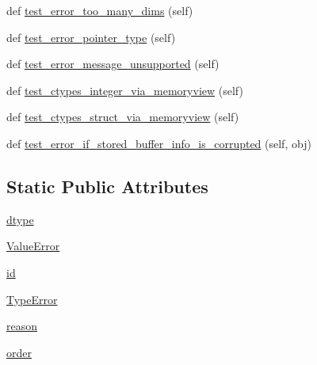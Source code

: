 \begin{DoxyCompactItemize}
def \hyperlink{classnumpy_1_1core_1_1tests_1_1test__multiarray_1_1TestNewBufferProtocol_a79ffe6eda22d8c97a056f10b239d3ecb}{test\+\_\+error\+\_\+too\+\_\+many\+\_\+dims} (self)
\item 
def \hyperlink{classnumpy_1_1core_1_1tests_1_1test__multiarray_1_1TestNewBufferProtocol_a1247bf00ff72ffba96c629f7abea78bd}{test\+\_\+error\+\_\+pointer\+\_\+type} (self)
\item 
def \hyperlink{classnumpy_1_1core_1_1tests_1_1test__multiarray_1_1TestNewBufferProtocol_a90f5aa2f57186c4939397c68f0f14856}{test\+\_\+error\+\_\+message\+\_\+unsupported} (self)
\item 
def \hyperlink{classnumpy_1_1core_1_1tests_1_1test__multiarray_1_1TestNewBufferProtocol_a9358562fc2cf78d22987d0c34dbc4f43}{test\+\_\+ctypes\+\_\+integer\+\_\+via\+\_\+memoryview} (self)
\item 
def \hyperlink{classnumpy_1_1core_1_1tests_1_1test__multiarray_1_1TestNewBufferProtocol_a361340c049b6dd7012ea361fe357414c}{test\+\_\+ctypes\+\_\+struct\+\_\+via\+\_\+memoryview} (self)
\item 
def \hyperlink{classnumpy_1_1core_1_1tests_1_1test__multiarray_1_1TestNewBufferProtocol_a6c0647e70943ae9978604771292df9cb}{test\+\_\+error\+\_\+if\+\_\+stored\+\_\+buffer\+\_\+info\+\_\+is\+\_\+corrupted} (self, obj)
\end{DoxyCompactItemize}
\subsection*{Static Public Attributes}
\begin{DoxyCompactItemize}
\item 
\hyperlink{classnumpy_1_1core_1_1tests_1_1test__multiarray_1_1TestNewBufferProtocol_a3250718656f06991ca9307ea8f73b9eb}{dtype}
\item 
\hyperlink{classnumpy_1_1core_1_1tests_1_1test__multiarray_1_1TestNewBufferProtocol_a3dc8b6680d518076046ddc5a66b7e56f}{Value\+Error}
\item 
\hyperlink{classnumpy_1_1core_1_1tests_1_1test__multiarray_1_1TestNewBufferProtocol_afc0f911b8936f50f9c3038f371672455}{id}
\item 
\hyperlink{classnumpy_1_1core_1_1tests_1_1test__multiarray_1_1TestNewBufferProtocol_a2d090a99f853fd29a63c7dcf91e14ac6}{Type\+Error}
\item 
\hyperlink{classnumpy_1_1core_1_1tests_1_1test__multiarray_1_1TestNewBufferProtocol_a8adbcee0a3cddacc77877be819bda5f8}{reason}
\item 
\hyperlink{classnumpy_1_1core_1_1tests_1_1test__multiarray_1_1TestNewBufferProtocol_a99e183981b3501ccae84567bba85fdda}{order}
\end{DoxyCompactItemize}


